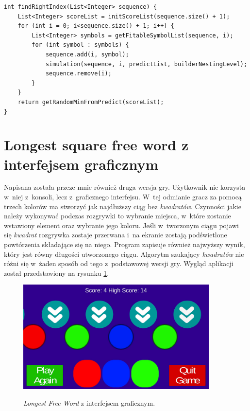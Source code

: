 \documentclass[document]{xmgr}
\begin{document}
\begin{lstlisting}[caption={Metoda szukająca pozycji, wykorzystująca rekurencję.},label=lst:findRightIndex]
int findRightIndex(List<Integer> sequence) {
	List<Integer> scoreList = initScoreList(sequence.size() + 1);
	for (int i = 0; i<sequence.size() + 1; i++) {
		List<Integer> symbols = getFitableSymbolList(sequence, i);
		for (int symbol : symbols) {
			sequence.add(i, symbol);
			simulation(sequence, i, predictList, builderNestingLevel);
			sequence.remove(i);
		}
	}
	return getRandomMinFromPredict(scoreList);
}
\end{lstlisting}

\section{Longest square free word z interfejsem graficznym}
Napisana została przeze mnie również druga wersja gry. Użytkownik nie korzysta w~niej z~konsoli, lecz z~graficznego interfejsu. W~tej odmianie gracz za pomocą trzech kolorów ma stworzyć jak najdłuższy ciąg bez \emph{kwadratów}. Czynności jakie należy wykonywać podczas rozgrywki to wybranie miejsca, w~które zostanie wstawiony element oraz wybranie jego koloru. Jeśli w~tworzonym ciągu pojawi się \emph{kwadrat} rozgrywka zostaje przerwana i~na ekranie zostają podświetlone powtórzenia składające się na niego. Program zapisuje również najwyższy wynik, który jest równy długości utworzonego ciągu. Algorytm szukający \emph{kwadratów} nie różni się w~żaden sposób od tego z~podstawowej wersji gry. Wygląd aplikacji został przedstawiony na rysunku \ref{fig:thueMobile}.

\begin{figure}[tbh]
    \centering
    \caption{\emph{Longest Free Word} z interfejsem graficznym.}
    \includegraphics[width = 0.9\textwidth]{images/thueMobile}
    \label{fig:thueMobile}
\end{figure}
\end{document}
